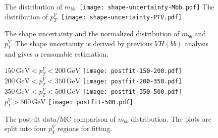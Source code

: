 \documentclass[class=NTHU_thesis, crop=false]{standalone}
\begin{document}
\begin{figure}[!hbt]
	\centering
	\subcaptionbox
	{The distribution of $m_{bb}$.
		\label{fig:shape-uncertainty-fig1}}
		{\texttt{[image: shape-uncertainty-Mbb.pdf]}}
	\vspace{\baselineskip}
	\subcaptionbox
	{The distribution of $p^V_T$.
		\label{fig:shape-uncertainty-fig2}}
		{\texttt{[image: shape-uncertainty-PTV.pdf]}}
	\caption{The shape uncertainty and the normalized distribution of $m_{bb}$ and $p^V_T$. The shape uncertainty is derived by previous $VH(bb)$ analysis and gives a reasonable estimation.}
	\label{fig:shape-uncertainty}
\end{figure}

\begin{figure}[!hbt]
	\captionsetup[subfigure]{labelformat=empty}
	\centering
	\subcaptionbox
	{$150\, \mathrm{GeV} < p^V_T < 200\, \mathrm{GeV}$
		\label{fig:2-lep-postfit-fig1}}
		{\texttt{[image: postfit-150-200.pdf]}}
	~
	\subcaptionbox
	{$200\, \mathrm{GeV} < p^V_T < 350\, \mathrm{GeV}$
		\label{fig:2-lep-postfit-fig2}}
		{\texttt{[image: postfit-200-350.pdf]}}
	\vspace{\baselineskip}
	\subcaptionbox
	{$350\, \mathrm{GeV} < p^V_T < 500\, \mathrm{GeV}$
		\label{fig:2-lep-postfit-fig3}}
		{\texttt{[image: postfit-350-500.pdf]}}
	~
	\subcaptionbox
	{$p^V_T > 500\, \mathrm{GeV}$
		\label{fig:2-lep-postfit-fig4}}
		{\texttt{[image: postfit-500.pdf]}}
	\caption{The post-fit data/MC comparison of $m_{bb}$ distribution. The plots are split into four $p^V_T$ regions for fitting.}
	\label{fig:2-lep-postfit}
\end{figure}
\end{document}
